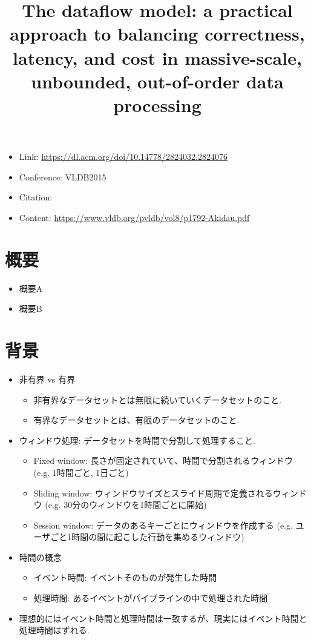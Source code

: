 \documentclass[dvipdfmx,uplatex]{jsarticle}
\title{The dataflow model: a practical approach to balancing correctness, latency, and cost in massive-scale, unbounded, out-of-order data processing}
\author{\empty}
\date{\empty}
\theoremstyle{remark}
\newenvironment{simplebox}{
    \begin{tcolorbox}[
        fonttitle=\bfseries,
    ]
}{
    \end{tcolorbox}
}
\begin{document}
\maketitle

\begin{itemize}
    \item Link: \url{https://dl.acm.org/doi/10.14778/2824032.2824076}
    \item Conference: VLDB2015
    \item Citation: \cite{dataflow-model}
    \item Content: \url{https://www.vldb.org/pvldb/vol8/p1792-Akidau.pdf}
\end{itemize}

\section{概要}
\begin{simplebox}
\begin{itemize}
    \item 概要A
    \item 概要B
\end{itemize}
\end{simplebox}

\section{背景}
\begin{simplebox}
\begin{itemize}
    \item 非有界 vs 有界
    \begin{itemize}
        \item 非有界なデータセットとは無限に続いていくデータセットのこと.
        \item 有界なデータセットとは、有限のデータセットのこと.
    \end{itemize}
    \item ウィンドウ処理: データセットを時間で分割して処理すること.
    \begin{itemize}
        \item Fixed window: 長さが固定されていて、時間で分割されるウィンドウ (e.g. 1時間ごと, 1日ごと)
        \item Sliding window: ウィンドウサイズとスライド周期で定義されるウィンドウ (e.g. 30分のウィンドウを1時間ごとに開始)
        \item Session window: データのあるキーごとにウィンドウを作成する (e.g. ユーザごと1時間の間に起こした行動を集めるウィンドウ)
    \end{itemize}
    \item 時間の概念
    \begin{itemize}
        \item イベント時間: イベントそのものが発生した時間
        \item 処理時間: あるイベントがパイプラインの中で処理された時間
    \end{itemize}
    \item 理想的にはイベント時間と処理時間は一致するが、現実にはイベント時間と処理時間はずれる.
\end{itemize}
\end{simplebox}
\end{document}
